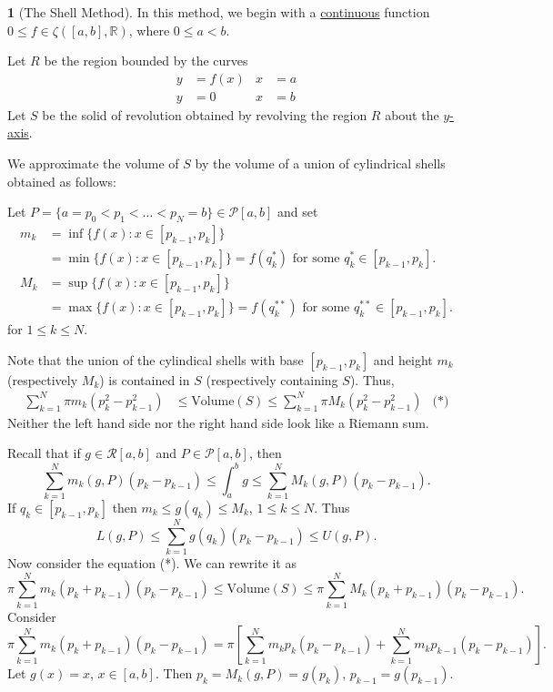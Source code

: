 \documentclass[11pt]{article}
\theoremstyle{definition}
\newtheorem{none}[thm]{}
\newcommand{\mbR}{\ensuremath{\mathbb{R}}}
\begin{document}
\begin{none}[The Shell Method]
In this method, we begin with a \underline{continuous} function $0 \leq f \in \zeta([a, b], \mbR)$, where $0 \leq a < b$. 

Let $R$ be the region bounded by the curves
\begin{align*}
y & = f(x) & x & = a \\ y & = 0 & x & = b
\end{align*}
Let $S$ be the solid of revolution obtained by revolving the region $R$ about the \underline{$y$-axis}. 

We approximate the volume of $S$ by the volume of a union of cylindrical shells obtained as follows: 

Let $P = \{a = p_0 < p_1 < \dots < p_N = b\} \in \mathcal{P}[a, b]$ and set
\begin{align*}
m_k & = \inf\{f(x) : x \in [p_{k-1}, p_k]\} \\
& = \min\{f(x) : x \in [p_{k-1}, p_k]\} = f(q_k^*) \text{ for some $q_k^* \in [p_{k-1}, p_k]$.} \\
M_k & = \sup\{f(x) : x \in [p_{k-1}, p_k]\} \\
& = \max\{f(x) : x \in [p_{k-1}, p_k]\} = f(q_k^{**}) \text{ for some $q_k^{**} \in [p_{k-1}, p_k]$.}
\end{align*}
for $1 \leq k \leq N$. 

Note that the union of the cylindical shells with base $[p_{k-1}, p_k]$ and height $m_k$ (respectively $M_k$) is contained in $S$ (respectively containing $S$). Thus,
\begin{align*} \sum_{k=1}^N \pi m_k(p_k^2 - p_{k-1}^2) & \leq \text{Volume}(S) \leq \sum_{k=1}^N \pi M_k(p_k^2 - p_{k-1}^2) & \text{(*)} \end{align*}
Neither the left hand side nor the right hand side look like a Riemann sum. 

Recall that if $g \in \mathcal{R}[a, b]$ and $P \in \mathcal{P}[a, b]$, then
$$\sum_{k=1}^N m_k(g, P)(p_k - p_{k-1}) \leq \int_a^b g \leq \sum_{k=1}^N M_k(g, P)(p_k - p_{k-1}) \text{.}$$
If $q_k \in [p_{k-1}, p_k]$ then $m_k \leq g(q_k) \leq M_k$, $1 \leq k \leq N$. Thus
$$L(g, P) \leq \sum_{k=1}^N g(q_k)(p_k - p_{k-1}) \leq U(g, P) \text{.}$$
Now consider the equation (*). We can rewrite it as
$$\pi \sum_{k=1}^N m_k(p_k + p_{k-1})(p_k - p_{k-1}) \leq \text{Volume}(S) \leq \pi \sum_{k=1}^N M_k(p_k + p_{k-1})(p_k - p_{k-1}) \text{.}$$
Consider
$$\pi \sum_{k=1}^N m_k (p_k + p_{k-1})(p_k - p_{k-1}) = \pi \left[ \sum_{k=1}^N m_k p_k (p_k - p_{k-1}) + \sum_{k=1}^N m_k p_{k-1} (p_k - p_{k-1})\right] \text{.}$$
Let $g(x) = x$, $x \in [a, b]$. Then $p_k = M_k(g, P) = g(p_k)$, $p_{k-1} = g(p_{k-1})$. 


\end{none}
\end{document}
